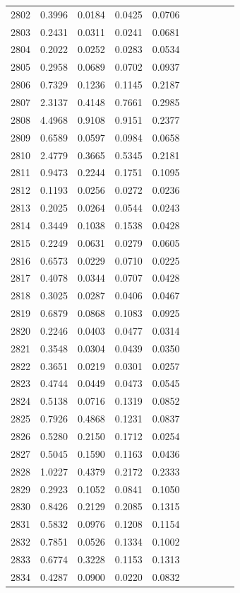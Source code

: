 \begin{table}
\begin{tabular}{cccccccccc}
2802& 0.3996& 0.0184& 0.0425& 0.0706\\ 
2803& 0.2431& 0.0311& 0.0241& 0.0681\\ 
2804& 0.2022& 0.0252& 0.0283& 0.0534\\ 
2805& 0.2958& 0.0689& 0.0702& 0.0937\\ 
2806& 0.7329& 0.1236& 0.1145& 0.2187\\ 
2807& 2.3137& 0.4148& 0.7661& 0.2985\\ 
2808& 4.4968& 0.9108& 0.9151& 0.2377\\ 
2809& 0.6589& 0.0597& 0.0984& 0.0658\\ 
2810& 2.4779& 0.3665& 0.5345& 0.2181\\ 
2811& 0.9473& 0.2244& 0.1751& 0.1095\\ 
2812& 0.1193& 0.0256& 0.0272& 0.0236\\ 
2813& 0.2025& 0.0264& 0.0544& 0.0243\\ 
2814& 0.3449& 0.1038& 0.1538& 0.0428\\ 
2815& 0.2249& 0.0631& 0.0279& 0.0605\\ 
2816& 0.6573& 0.0229& 0.0710& 0.0225\\ 
2817& 0.4078& 0.0344& 0.0707& 0.0428\\ 
2818& 0.3025& 0.0287& 0.0406& 0.0467\\ 
2819& 0.6879& 0.0868& 0.1083& 0.0925\\ 
2820& 0.2246& 0.0403& 0.0477& 0.0314\\ 
2821& 0.3548& 0.0304& 0.0439& 0.0350\\ 
2822& 0.3651& 0.0219& 0.0301& 0.0257\\ 
2823& 0.4744& 0.0449& 0.0473& 0.0545\\ 
2824& 0.5138& 0.0716& 0.1319& 0.0852\\ 
2825& 0.7926& 0.4868& 0.1231& 0.0837\\ 
2826& 0.5280& 0.2150& 0.1712& 0.0254\\ 
2827& 0.5045& 0.1590& 0.1163& 0.0436\\ 
2828& 1.0227& 0.4379& 0.2172& 0.2333\\ 
2829& 0.2923& 0.1052& 0.0841& 0.1050\\ 
2830& 0.8426& 0.2129& 0.2085& 0.1315\\ 
2831& 0.5832& 0.0976& 0.1208& 0.1154\\ 
2832& 0.7851& 0.0526& 0.1334& 0.1002\\ 
2833& 0.6774& 0.3228& 0.1153& 0.1313\\ 
2834& 0.4287& 0.0900& 0.0220& 0.0832\\ 

\end{tabular}
\end{table}
